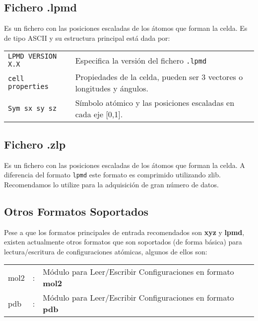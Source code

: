 \subsection{Fichero .lpmd}

Es un fichero con las posiciones escaladas de los \'atomos que forman la celda. Es de tipo ASCII y su estructura principal est\'a dada por:

\begin{center}
 \begin{tabular}{l|l}
 \verb|LPMD VERSION X.X | & Especifica la versi\'on del fichero \verb|.lpmd| \\
 \verb|cell properties | & Propiedades de la celda, pueden ser 3 vectores o longitudes y \'angulos. \\
 \verb|Sym sx sy sz| & S\'imbolo at\'omico y las posiciones escaladas en cada eje [0,1].\\
\end{tabular}
\end{center}

\subsection{Fichero .zlp}

Es un fichero con las posiciones escaladas de los \'atomos que forman la celda. A diferencia del formato \verb|lpmd| este formato es comprimido utilizando zlib. Recomendamos lo utilize para la adquisici\'on de gran n\'umero de datos.

\subsection{Otros Formatos Soportados}

Pese a que los formatos principales de entrada recomendados son \textbf{xyz} y \textbf{lpmd}, existen actualmente otros formatos que son soportados (de forma b\'asica) para lectura/escritura de configuraciones at\'omicas, algunos de ellos son:

\begin{tabular}{lcl}\\
 mol2 &:& M\'odulo para Leer/Escribir Configuraciones en formato \textbf{mol2} \\
 pdb  &:& M\'odulo para Leer/Escribir Configuraciones en formato \textbf{pdb} \\
\end{tabular}



